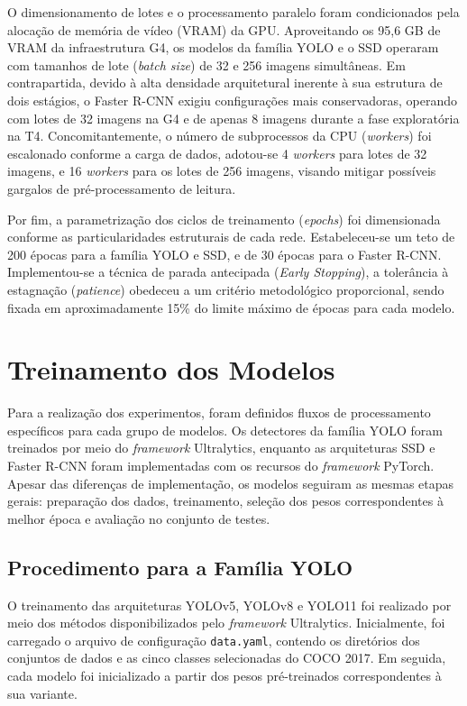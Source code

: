 \vspace{1em}
O dimensionamento de lotes e o processamento paralelo foram condicionados pela alocação de
memória de vídeo (VRAM) da GPU. Aproveitando os 95,6 GB de VRAM da infraestrutura G4, os
modelos da família YOLO e o SSD operaram com tamanhos de lote (\textit{batch size}) de 32 e
256 imagens simultâneas. Em contrapartida, devido à alta densidade arquitetural inerente à sua
estrutura de dois estágios, o Faster R-CNN exigiu configurações mais conservadoras, operando
com lotes de 32 imagens na G4 e de apenas 8 imagens durante a fase exploratória na T4.
Concomitantemente, o número de subprocessos da CPU (\textit{workers}) foi escalonado conforme
a carga de dados, adotou-se 4 \textit{workers} para lotes de 32 imagens, e 16
\textit{workers} para os lotes de 256 imagens, visando mitigar possíveis gargalos de
pré-processamento de leitura.

Por fim, a parametrização dos ciclos de treinamento (\textit{epochs}) foi dimensionada
conforme as particularidades estruturais de cada rede. Estabeleceu-se um teto de 200 épocas
para a família YOLO e SSD, e de 30 épocas para o Faster R-CNN. Implementou-se a técnica de 
parada antecipada (\textit{Early Stopping}), a tolerância à estagnação (\textit{patience}) 
obedeceu a um critério metodológico proporcional, sendo fixada em aproximadamente 15\% do 
limite máximo de épocas para cada modelo.

\section{Treinamento dos Modelos}
Para a realização dos experimentos, foram definidos fluxos de processamento específicos para
cada grupo de modelos. Os detectores da família YOLO foram treinados por meio do
\textit{framework} Ultralytics, enquanto as arquiteturas SSD e Faster R-CNN foram
implementadas com os recursos do \textit{framework} PyTorch. Apesar das diferenças de
implementação, os modelos seguiram as mesmas etapas gerais: preparação dos dados,
treinamento, seleção dos pesos correspondentes à melhor época e avaliação no conjunto de testes.

\subsection{Procedimento para a Família YOLO}
O treinamento das arquiteturas YOLOv5, YOLOv8 e YOLO11 foi realizado por meio dos métodos
disponibilizados pelo \textit{framework} Ultralytics. Inicialmente, foi carregado o arquivo de
configuração \texttt{data.yaml}, contendo os diretórios dos conjuntos de dados e as cinco
classes selecionadas do COCO 2017. Em seguida, cada modelo foi inicializado a partir dos pesos
pré-treinados correspondentes à sua variante.

